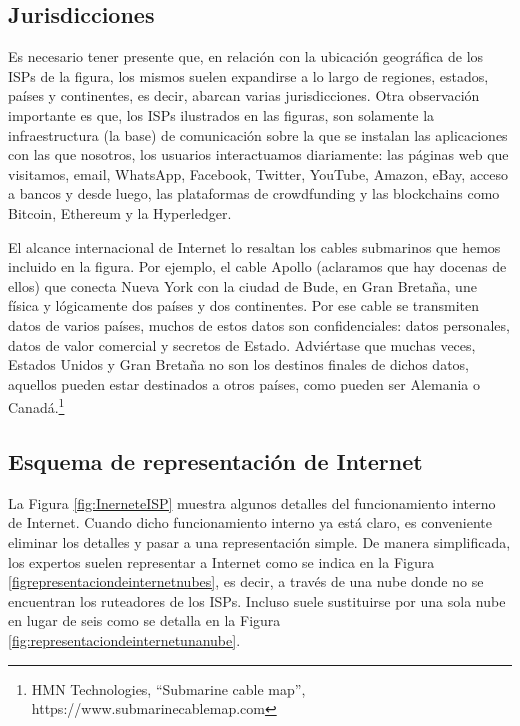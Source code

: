 \documentclass[12pt]{report} %
\begin{document}
\subsection{Jurisdicciones}

Es necesario tener presente que, en relación con la ubicación geográfica de los ISPs de la figura, los mismos suelen expandirse a lo largo de regiones, estados, países y continentes, es decir, abarcan varias jurisdicciones.  Otra observación importante es que, los ISPs ilustrados en las figuras, son solamente la infraestructura (la base) de comunicación sobre la que se instalan las aplicaciones con las que nosotros, los usuarios interactuamos diariamente: las páginas web que visitamos, email, WhatsApp, Facebook, Twitter, YouTube, Amazon, eBay, acceso a bancos y desde luego, las plataformas de crowdfunding y las blockchains como Bitcoin, Ethereum y la Hyperledger.

El alcance internacional de Internet lo resaltan los cables submarinos que hemos incluido en la figura. Por ejemplo, el cable Apollo (aclaramos que hay docenas de ellos) que conecta Nueva York con la ciudad de Bude, en Gran Bretaña, une física y lógicamente dos países y dos continentes. Por ese cable se transmiten datos de varios países, muchos de estos datos son confidenciales: datos personales, datos de valor comercial y secretos de Estado. Adviértase que muchas veces, Estados Unidos y Gran Bretaña no son los destinos finales de dichos datos, aquellos pueden estar destinados a otros países, como pueden ser Alemania o Canadá.\footnote{HMN Technologies, “Submarine cable map”, https://www.submarinecablemap.com}   

\subsection{Esquema de representación de Internet}

La Figura \ref{fig:InerneteISP} muestra algunos detalles del funcionamiento interno de Internet. Cuando dicho funcionamiento interno ya está claro, es conveniente eliminar los detalles y pasar a una representación simple. De manera simplificada, los expertos suelen representar a Internet como se indica en la Figura \ref{figrepresentaciondeinternetnubes}, es decir, a través de una nube donde no se encuentran los ruteadores de los ISPs. Incluso suele sustituirse por una sola nube en lugar de seis como se detalla en la Figura \ref{fig:representaciondeinternetunanube}. 
\end{document}
